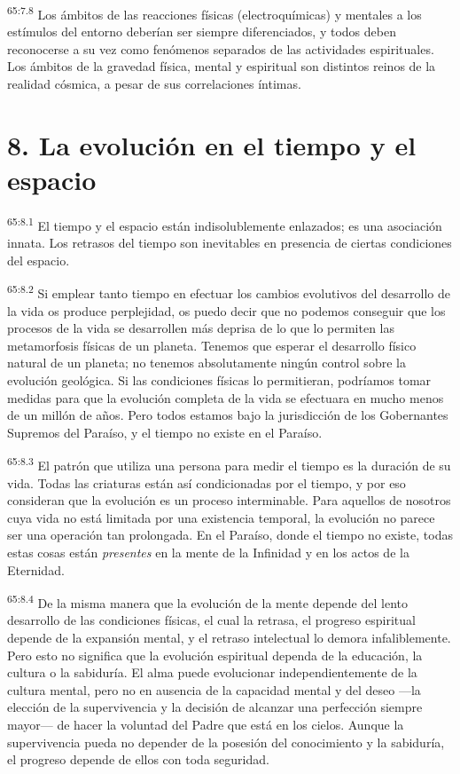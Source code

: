 \par
\textsuperscript{65:7.8} Los ámbitos de las reacciones físicas (electroquímicas) y mentales a los estímulos del entorno deberían ser siempre diferenciados, y todos deben reconocerse a su vez como fenómenos separados de las actividades espirituales. Los ámbitos de la gravedad física, mental y espiritual son distintos reinos de la realidad cósmica, a pesar de sus correlaciones íntimas.

\section*{8. La evolución en el tiempo y el espacio}
\par
\textsuperscript{65:8.1} El tiempo y el espacio están indisolublemente enlazados; es una asociación innata. Los retrasos del tiempo son inevitables en presencia de ciertas condiciones del espacio.

\par
\textsuperscript{65:8.2} Si emplear tanto tiempo en efectuar los cambios evolutivos del desarrollo de la vida os produce perplejidad, os puedo decir que no podemos conseguir que los procesos de la vida se desarrollen más deprisa de lo que lo permiten las metamorfosis físicas de un planeta. Tenemos que esperar el desarrollo físico natural de un planeta; no tenemos absolutamente ningún control sobre la evolución geológica. Si las condiciones físicas lo permitieran, podríamos tomar medidas para que la evolución completa de la vida se efectuara en mucho menos de un millón de años. Pero todos estamos bajo la jurisdicción de los Gobernantes Supremos del Paraíso, y el tiempo no existe en el Paraíso.

\par
\textsuperscript{65:8.3} El patrón que utiliza una persona para medir el tiempo es la duración de su vida. Todas las criaturas están así condicionadas por el tiempo, y por eso consideran que la evolución es un proceso interminable. Para aquellos de nosotros cuya vida no está limitada por una existencia temporal, la evolución no parece ser una operación tan prolongada. En el Paraíso, donde el tiempo no existe, todas estas cosas están \textit{presentes} en la mente de la Infinidad y en los actos de la Eternidad.

\par
\textsuperscript{65:8.4} De la misma manera que la evolución de la mente depende del lento desarrollo de las condiciones físicas, el cual la retrasa, el progreso espiritual depende de la expansión mental, y el retraso intelectual lo demora infaliblemente. Pero esto no significa que la evolución espiritual dependa de la educación, la cultura o la sabiduría. El alma puede evolucionar independientemente de la cultura mental, pero no en ausencia de la capacidad mental y del deseo ---la elección de la supervivencia y la decisión de alcanzar una perfección siempre mayor--- de hacer la voluntad del Padre que está en los cielos. Aunque la supervivencia pueda no depender de la posesión del conocimiento y la sabiduría, el progreso depende de ellos con toda seguridad.

